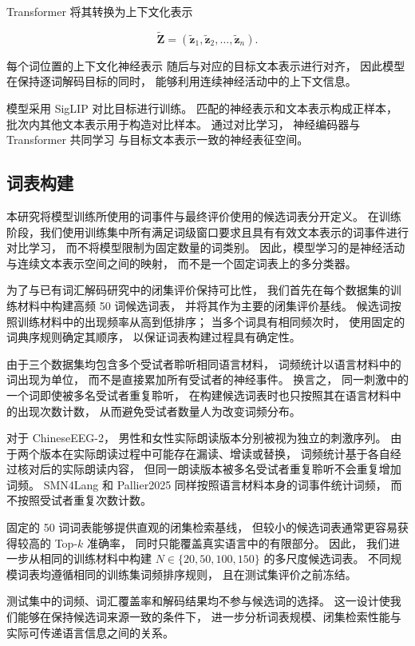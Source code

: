 Transformer 将其转换为上下文化表示

\[
\widetilde{\mathbf{Z}}
=
(\widetilde{\mathbf{z}}_1,
\widetilde{\mathbf{z}}_2,
\ldots,
\widetilde{\mathbf{z}}_n).
\]

每个词位置的上下文化神经表示
随后与对应的目标文本表示进行对齐，
因此模型在保持逐词解码目标的同时，
能够利用连续神经活动中的上下文信息。

模型采用 SigLIP 对比目标进行训练。
匹配的神经表示和文本表示构成正样本，
批次内其他文本表示用于构造对比样本。
通过对比学习，
神经编码器与 Transformer 共同学习
与目标文本表示一致的神经表征空间。

\subsection{词表构建}

本研究将模型训练所使用的词事件与最终评价使用的候选词表分开定义。
在训练阶段，我们使用训练集中所有满足词级窗口要求且具有有效文本表示的词事件进行对比学习，
而不将模型限制为固定数量的词类别。
因此，模型学习的是神经活动与连续文本表示空间之间的映射，
而不是一个固定词表上的多分类器。

为了与已有词汇解码研究中的闭集评价保持可比性，
我们首先在每个数据集的训练材料中构建高频 50 词候选词表，
并将其作为主要的闭集评价基线。
候选词按照训练材料中的出现频率从高到低排序；
当多个词具有相同频次时，
使用固定的词典序规则确定其顺序，
以保证词表构建过程具有确定性。

由于三个数据集均包含多个受试者聆听相同语言材料，
词频统计以语言材料中的词出现为单位，
而不是直接累加所有受试者的神经事件。
换言之，
同一刺激中的一个词即使被多名受试者重复聆听，
在构建候选词表时也只按照其在语言材料中的出现次数计数，
从而避免受试者数量人为改变词频分布。

对于 ChineseEEG-2，
男性和女性实际朗读版本分别被视为独立的刺激序列。
由于两个版本在实际朗读过程中可能存在漏读、增读或替换，
词频统计基于各自经过核对后的实际朗读内容，
但同一朗读版本被多名受试者重复聆听不会重复增加词频。
SMN4Lang 和 Pallier2025 同样按照语言材料本身的词事件统计词频，
而不按照受试者重复次数计数。

固定的 50 词词表能够提供直观的闭集检索基线，
但较小的候选词表通常更容易获得较高的 Top-$k$ 准确率，
同时只能覆盖真实语言中的有限部分。
因此，
我们进一步从相同的训练材料中构建
$N\in\{20,50,100,150\}$ 的多尺度候选词表。
不同规模词表均遵循相同的训练集词频排序规则，
且在测试集评价之前冻结。

测试集中的词频、词汇覆盖率和解码结果均不参与候选词的选择。
这一设计使我们能够在保持候选词来源一致的条件下，
进一步分析词表规模、闭集检索性能与实际可传递语言信息之间的关系。

